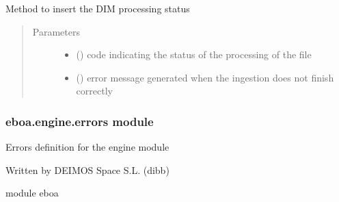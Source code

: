 \begin{fulllineitems}
\label{\detokenize{eboa.engine:eboa.engine.engine.insert_source_status}}
Method to insert the DIM processing status
\begin{quote}\begin{description}
\item[{Parameters}] \leavevmode\begin{itemize}
\item {} 
 () \textendash{} code indicating the status of the processing of the file

\item {} 
 () \textendash{} error message generated when the ingestion does not finish correctly

\end{itemize}

\end{description}\end{quote}

\end{fulllineitems}



\subsubsection{eboa.engine.errors module}
\label{\detokenize{eboa.engine:module-eboa.engine.errors}}\label{\detokenize{eboa.engine:eboa-engine-errors-module}}
Errors definition for the engine module

Written by DEIMOS Space S.L. (dibb)

module eboa

